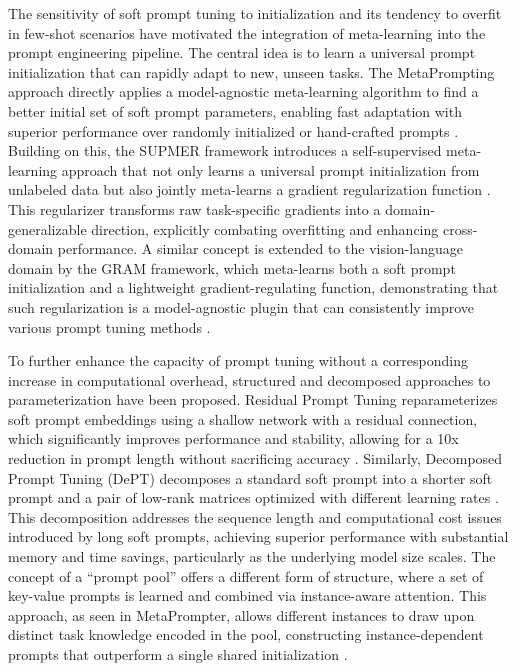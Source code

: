 \documentclass[11pt]{article}
\begin{document}
The sensitivity of soft prompt tuning to initialization and its tendency to overfit in few-shot scenarios have motivated the integration of meta-learning into the prompt engineering pipeline. The central idea is to learn a universal prompt initialization that can rapidly adapt to new, unseen tasks. The MetaPrompting approach directly applies a model-agnostic meta-learning algorithm to find a better initial set of soft prompt parameters, enabling fast adaptation with superior performance over randomly initialized or hand-crafted prompts \cite{ref156}. Building on this, the SUPMER framework introduces a self-supervised meta-learning approach that not only learns a universal prompt initialization from unlabeled data but also jointly meta-learns a gradient regularization function \cite{ref157}. This regularizer transforms raw task-specific gradients into a domain-generalizable direction, explicitly combating overfitting and enhancing cross-domain performance. A similar concept is extended to the vision-language domain by the GRAM framework, which meta-learns both a soft prompt initialization and a lightweight gradient-regulating function, demonstrating that such regularization is a model-agnostic plugin that can consistently improve various prompt tuning methods \cite{ref158}.

To further enhance the capacity of prompt tuning without a corresponding increase in computational overhead, structured and decomposed approaches to parameterization have been proposed. Residual Prompt Tuning reparameterizes soft prompt embeddings using a shallow network with a residual connection, which significantly improves performance and stability, allowing for a 10x reduction in prompt length without sacrificing accuracy \cite{ref159}. Similarly, Decomposed Prompt Tuning (DePT) decomposes a standard soft prompt into a shorter soft prompt and a pair of low-rank matrices optimized with different learning rates \cite{ref160}. This decomposition addresses the sequence length and computational cost issues introduced by long soft prompts, achieving superior performance with substantial memory and time savings, particularly as the underlying model size scales. The concept of a ``prompt pool'' offers a different form of structure, where a set of key-value prompts is learned and combined via instance-aware attention. This approach, as seen in MetaPrompter, allows different instances to draw upon distinct task knowledge encoded in the pool, constructing instance-dependent prompts that outperform a single shared initialization \cite{ref161}.
\end{document}
